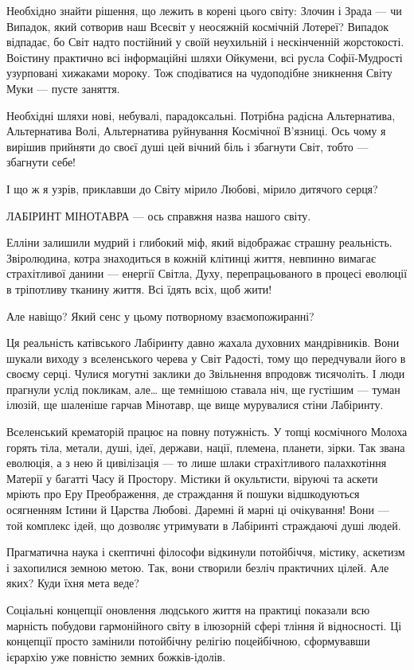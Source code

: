 Необхідно знайти рішення, що лежить в корені цього світу: Злочин і Зрада — чи
Випадок, який сотворив наш Всесвіт у неосяжній космічній Лотереї? Випадок
відпадає, бо Світ надто постійний у своїй неухильній і нескінченній
жорстокості. Воістину практично всі інформаційні шляхи Ойкумени, всі русла
Софії-Мудрості узурповані хижаками мороку. Тож сподіватися на чудоподібне
зникнення Світу Муки — пусте заняття.

Необхідні шляхи нові, небувалі, парадоксальні. Потрібна радісна Альтернатива,
Альтернатива Волі, Альтернатива руйнування Космічної В’язниці. Ось чому я
вирішив прийняти до своєї душі цей вічний біль і збагнути Світ, тобто —
збагнути себе!

І що ж я узрів, приклавши до Світу мірило Любові, мірило дитячого серця?

ЛАБІРИНТ МІНОТАВРА — ось справжня назва нашого світу.

Елліни залишили мудрий і глибокий міф, який відображає страшну реальність.
Звіролюдина, котра знаходиться в кожній клітинці життя, невпинно вимагає
страхітливої данини — енергії Світла, Духу, перепрацьованого в процесі еволюції
в тріпотливу тканину життя. Всі їдять всіх, щоб жити!

Але навіщо? Який сенс у цьому потворному взаємопожиранні?

Ця реальність катівського Лабіринту давно жахала духовних мандрівників. Вони
шукали виходу з вселенського черева у Світ Радості, тому що передчували його в
своєму серці. Чулися могутні заклики до Звільнення впродовж тисячоліть. І люди
прагнули услід покликам, але… ще темнішою ставала ніч, ще густішим — туман
ілюзій, ще шаленіше гарчав Мінотавр, ще вище мурувалися стіни Лабіринту.

Вселенський крематорій працює на повну потужність. У топці космічного Молоха
горять тіла, метали, душі, ідеї, держави, нації, племена, планети, зірки. Так
звана еволюція, а з нею й цивілізація — то лише шлаки страхітливого
палахкотіння Матерії у багатті Часу й Простору. Містики й окультисти, віруючі
та аскети мріють про Еру Преображення, де страждання й пошуки відшкодуються
осягненням Істини й Царства Любові. Даремні й марні ці очікування! Вони — той
комплекс ідей, що дозволяє утримувати в Лабіринті страждаючі душі людей.

Прагматична наука і скептичні філософи відкинули потойбіччя, містику, аскетизм
і захопилися земною метою. Так, вони створили безліч практичних цілей. Але
яких? Куди їхня мета веде?

Соціальні концепції оновлення людського життя на практиці показали всю марність
побудови гармонійного світу в ілюзорній сфері тління й відносності. Ці
концепції просто замінили потойбічну релігію поцейбічною, сформувавши ієрархію
уже повністю земних божків-ідолів.

